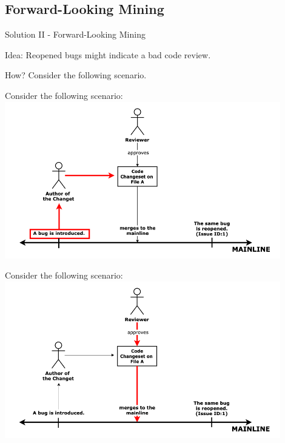 \documentclass{beamer}
\begin{document}
  
    \subsection{Forward-Looking Mining}
    \begin{frame}{Solution II - Forward-Looking Mining}
        \begin{block}{Idea:}
        Reopened bugs might indicate a bad code review.
        \end{block}
        \pause
        \begin{exampleblock}{How?}
        Consider the following scenario.
        \end{exampleblock}
    

    \end{frame}
    
    \begin{frame}{Consider the following scenario:}
    \centering\includegraphics[width=0.9\textwidth]{img/future_mining_1.png}\newline\newline
    \caption{To fix a bug, a developer creates a pull request.}
    \end{frame}
    
    \begin{frame}{Consider the following scenario:}
    \centering\includegraphics[width=0.9\textwidth]{img/future_mining_2.png}\newline\newline
    \caption{The assigned reviewer approves the pull request and the bug is closed.}
    \end{frame}  
    
\end{document}

